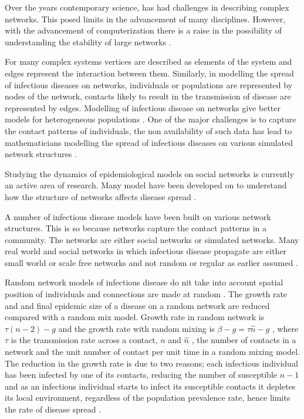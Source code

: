 Over the years contemporary science, has had challenges in describing complex networks. This posed limits in the advancement of many disciplines. However, with the advancement  of computerization there is a raise in the possibility of understanding the stability of large networks \cite{barabasi1999emergence} .

For many complex systems vertices are described as elements of the system and edges represent the interaction between them. Similarly, in modelling the spread of  infectious diseases on networks, individuals or populations are represented by nodes of the network, contacts likely to result in the transmission of disease are represented by edges. Modelling of infectious disease on networks give better models for heterogeneous populations \citep{ming2016stochastic}. One of the major challenges is to capture the contact patterns of individuals, the non availability of such data has lead to mathematicians modelling the spread of infectious diseases on various simulated network structures \citep{pastor2001}.

Studying the dynamics of epidemiological models on social networks is currently an active area of research. Many model have been developed on to understand  how the structure of networks affects disease spread \citep{keeling2005networks}.

A number of infectious disease models have been built on various network structures. This is so because networks capture the contact patterns in a community. The networks are either social networks or simulated networks. Many real world and social networks in which infectious disease propagate are either small world or scale free networks and not random or regular as earlier assumed \cite{watts1998collective}.

Random network models of infectious disease do nit take into account spatial position of individuals and connections are made at random \citep{keeling2005networks}. The growth rate and and final epidemic size of a disease on a random network are reduced compared with a random mix model. Growth rate in random network is $\tau (n -2) -g$ and the growth rate with random mixing is $\beta -g = \tau \widehat{n} -g$ , where  $\tau$ is the transmission rate across a contact, $n$ and $\widehat{n} $ , the number of contacts in a network and the unit number of contact per unit time in a random mixing model. The reduction in the growth rate is due to two reasons; each infectious individual has been infected by one of its contacts, reducing the number of susceptible $n-1$ and as an infectious individual starts to infect its susceptible contacts it depletes its local environment, regardless of the population prevalence rate, hence limits the rate of disease spread \citep{keeling2005networks}.

